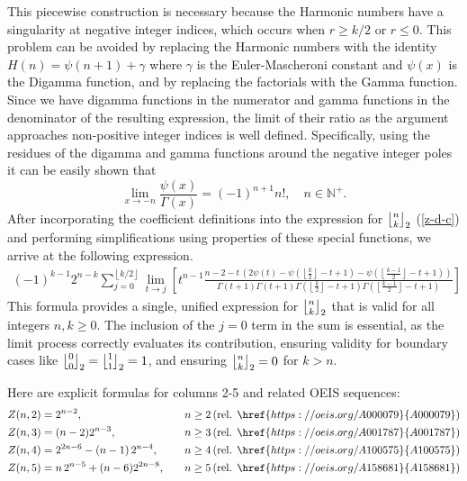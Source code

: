 \documentclass[a4paper]{amsart}
\newcommand{\mStirling}[0]{\genfrac{\lfloor}{\rfloor}{0pt}{}}
\newcommand{\floor}[1]{\left\lfloor #1 \right\rfloor}
\begin{document}
This piecewise construction is necessary because the Harmonic numbers have a singularity at negative integer indices, which occurs when $r \geq k/2$ or $r\leq 0$. This problem can be avoided by replacing the Harmonic numbers with the identity $H(n) = \psi(n+1)+\gamma$ where $\gamma$ is the Euler-Mascheroni constant and $\psi(x)$ is the Digamma function, and by replacing the factorials with the Gamma function. Since we have digamma functions in the numerator and gamma functions in the denominator of the resulting expression, the limit of their ratio as the argument approaches non-positive integer indices is well defined. Specifically, using the residues of the digamma and gamma functions around the negative integer poles it can be easily shown that
$$
\lim_{x \to -n}\frac{\psi(x)}{\Gamma(x)} = (-1)^{n+1}n!, \quad n \in\mathbb{N}^{+}.
$$
After incorporating the coefficient definitions into the expression for $\mStirling{n}{k}_2$ (\ref{z-d-c}) and performing simplifications using properties of these special functions, we arrive at the following expression. 
$$
\begin{aligned}
    (-1)^{k-1} 2^{n-k} \sum_{j=0}^{\floor{k/2}} \lim_{t \to j} \left[t^{n-1}
        \frac
            {n-2-t\,\left(2\psi(t)-\psi\left(\floor{\frac{k}{2}}-t+1\right)-\psi\left(\floor{\frac{k-1}{2}}-t+1\right)\right)}
            {\Gamma(t+1) \Gamma(t+1) \Gamma(\floor{\frac{k}{2}}-t+1) \Gamma(\floor{\frac{k-1}{2}}-t+1)}\right]
\end{aligned}
$$
This formula provides a single, unified expression for $\mStirling{n}{k}_2$ that is valid for all integers $n,k \geq 0$. The inclusion of the $j=0$ term in the sum is essential, as the limit process correctly evaluates its contribution, ensuring validity for boundary cases like $\mStirling{0}{0}_2=\mStirling{1}{1}_2=1$, and ensuring $\mStirling{n}{k}_2=0$ for $k>n$.

Here are explicit formulas for columns 2-5 and related OEIS sequences:
\[
    \begin{aligned}
        Z(n,2) &= 2^{n-2}, & \quad n \ge 2\, (\text{rel. } \href{https://oeis.org/A000079}{A000079})\\
        Z(n,3) &= (n-2)2^{n-3}, & \quad n \ge 3\, (\text{rel. } \href{https://oeis.org/A001787}{A001787})\\
        Z(n,4) &= 2^{2n-6}-(n-1)\,2^{n-4}, & n\geq 4 \, (\text{rel. } \href{https://oeis.org/A100575}{A100575})\\
        Z(n,5) &= n\,2^{n-5}+(n-6) 2^{2n-8}, & n\geq 5 \, (\text{rel. } \href{https://oeis.org/A158681}{A158681})\\
    \end{aligned}
\]
\end{document}
